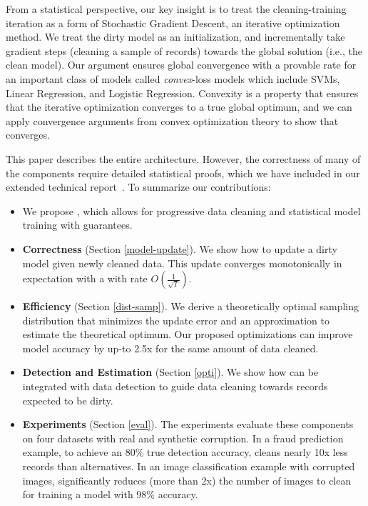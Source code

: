 From a statistical perspective, our key insight is to treat the cleaning-training iteration as a form of Stochastic Gradient Descent, an iterative optimization method.
We treat the dirty model as an initialization, and incrementally take gradient steps (cleaning a sample of records) towards the global solution (i.e., the clean model).
Our argument ensures global convergence with a provable rate for an important class of models called \emph{convex}-loss models which include SVMs, Linear Regression, and Logistic Regression.
Convexity is a property that ensures that the iterative optimization converges to a true global optimum, and we can apply convergence arguments from convex optimization theory to show that \sys converges.

This paper describes the entire \sys architecture. However, the correctness of many of the components require detailed statistical proofs, which we have included in our extended technical report~\cite{activecleanarxiv}. To summarize our contributions:
\begin{itemize}[noitemsep]
\item We propose \sys, which allows for progressive data cleaning and statistical model training with guarantees.
\item \textbf{Correctness} (Section \ref{model-update}). We show how to update a dirty model given newly cleaned data. This update converges monotonically in expectation with a with rate $O(\frac{1}{\sqrt{T}})$.
\item \textbf{Efficiency} (Section \ref{dist-samp}). We derive a theoretically optimal sampling distribution that minimizes the update error and an approximation to estimate the theoretical optimum. Our proposed optimizations can improve model accuracy by up-to 2.5x for the same amount of data cleaned.
\item \textbf{Detection and Estimation} (Section \ref{opti}). We show how \sys can be integrated with data detection to guide data cleaning towards records expected to be dirty.
\item \textbf{Experiments} (Section \ref{eval}). The experiments evaluate these components on four datasets with real and synthetic corruption. In a fraud prediction example, to achieve an 80\% true detection accuracy, \sys cleans nearly 10x less records than alternatives. In an image classification example with corrupted images, \sys significantly reduces
(more than 2x) the number of images to clean for training a model with 98\% accuracy.
\end{itemize}






